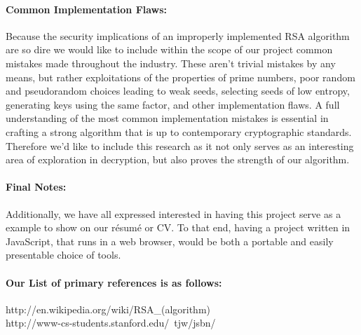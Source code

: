 \documentclass[12pt]{article}
\begin{document}
\paragraph{Common Implementation Flaws:\\}
Because the security implications of an improperly implemented RSA algorithm 
are so dire we would like to include within the scope of our project common 
mistakes made throughout the industry. These aren’t trivial mistakes by any 
means, but rather exploitations of the properties of prime numbers, poor random
and  pseudorandom choices leading to weak seeds, selecting seeds of low entropy,
generating keys using the same factor, and other implementation flaws. A full 
understanding of the most common implementation mistakes is essential in 
crafting  a strong algorithm that is up to contemporary cryptographic standards.
Therefore  we’d like to include this research as it not only serves as an 
interesting area of exploration in decryption, but also proves the strength of 
our algorithm.

\paragraph{Final Notes:\\}
Additionally, we have all expressed interested in having this project serve as 
a example to show on our r\'{e}sum\'{e} or CV. To that end, having a project 
written in JavaScript, that runs in a web browser, would be both a portable 
and easily  presentable choice of tools.

\paragraph{Our List of primary references is as follows:\\}
http://en.wikipedia.org/wiki/RSA\_(algorithm)\\
http://www-cs-students.stanford.edu/~tjw/jsbn/
\end{document}
